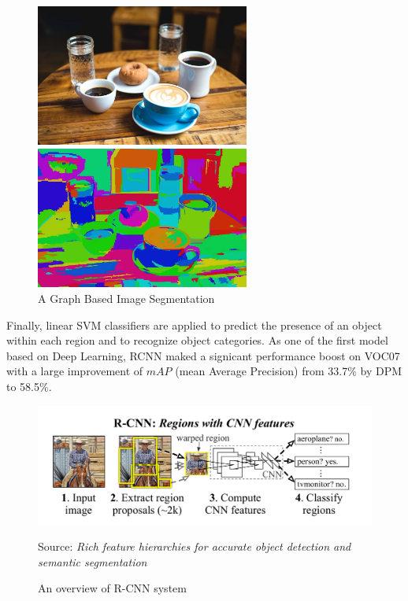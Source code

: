 \documentclass[12pt]{article}
\newcommand{\source}[1]{\caption*{Source: \emph{#1}} }
\begin{document}
\begin{figure}[!htb]
    \begin{minipage}{0.48\textwidth}
        \centering
        \includegraphics[width=7cm]{images/input.png}
    \end{minipage}
    \begin{minipage}{0.48\textwidth}
        \centering
        \includegraphics[width=7cm]{images/output.png}
    \end{minipage}
    \caption{A Graph Based Image Segmentation}
    \label{fig:basedsegmentation}
\end{figure}

Finally, linear SVM classifiers are applied to predict the presence of an object 
within each region and to recognize object categories. As one of the first model based 
on Deep Learning, RCNN maked a signicant performance boost on VOC07 with a large 
improvement of $mAP$ (mean Average Precision) from 33.7\% by DPM \cite{felzenszwalb2008discriminatively}
to 58.5\%.

\begin{figure}[htp]
    \centering
    \includegraphics[width=1\textwidth]{images/rcnn.png}
    \caption{An overview of R-CNN system}
    \label{fig:rcnn}
    \source{Rich feature hierarchies for accurate object detection and semantic segmentation \cite{girshick2014rich}}
\end{figure}
\end{document}
